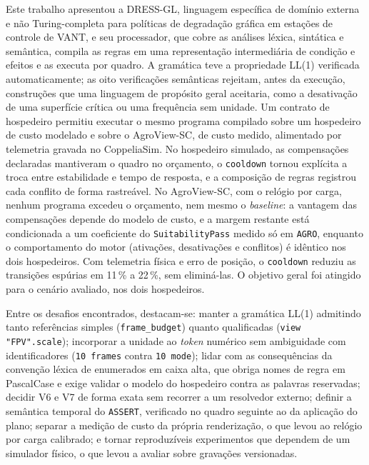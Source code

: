 \documentclass[conference]{IEEEtran}
\begin{document}
Este trabalho apresentou a DRESS-GL, linguagem específica de domínio externa e
não Turing-completa para políticas de degradação gráfica em estações de
controle de VANT, e seu processador, que cobre as análises léxica, sintática e
semântica, compila as regras em uma representação intermediária de condição e
efeitos e as executa por quadro. A gramática teve a propriedade LL(1)
verificada automaticamente; as oito verificações semânticas rejeitam, antes da
execução, construções que uma linguagem de propósito geral aceitaria, como a
desativação de uma superfície crítica ou uma frequência sem unidade. Um
contrato de hospedeiro permitiu executar o mesmo programa compilado sobre um
hospedeiro de custo modelado e sobre o AgroView-SC, de custo medido, alimentado
por telemetria gravada no CoppeliaSim. No hospedeiro simulado, as compensações
declaradas mantiveram o quadro no orçamento, o \texttt{cooldown} tornou
explícita a troca entre estabilidade e tempo de resposta, e a composição de
regras registrou cada conflito de forma rastreável. No AgroView-SC, com o relógio por carga, nenhum
programa excedeu o orçamento, nem mesmo o \textit{baseline}: a vantagem das
compensações depende do modelo de custo, e a margem restante está condicionada a um
coeficiente do \texttt{SuitabilityPass} medido só em \texttt{AGRO}, enquanto o
comportamento do motor
(ativações, desativações e conflitos) é idêntico nos dois hospedeiros. Com
telemetria física e erro de posição, o \texttt{cooldown} reduziu as transições
espúrias em 11\,\% a 22\,\%, sem eliminá-las. O objetivo geral foi atingido
para o cenário avaliado, nos dois hospedeiros.

Entre os desafios encontrados, destacam-se: manter a gramática LL(1) admitindo
tanto referências simples (\texttt{frame\_budget}) quanto qualificadas
(\texttt{view "FPV".scale}); incorporar a unidade ao \textit{token} numérico
sem ambiguidade com identificadores (\texttt{10 frames} contra
\texttt{10 mode}); lidar com as consequências da convenção léxica de
enumerados em caixa alta, que obriga nomes de regra em PascalCase e exige
validar o modelo do hospedeiro contra as palavras reservadas; decidir V6 e V7
de forma exata sem recorrer a um resolvedor externo; definir a semântica
temporal do \texttt{ASSERT}, verificado no quadro seguinte ao da aplicação do
plano; separar a medição de custo da própria renderização, o que levou ao
relógio por carga calibrado; e tornar reproduzíveis experimentos que dependem
de um simulador físico, o que levou a avaliar sobre gravações versionadas.
\end{document}
